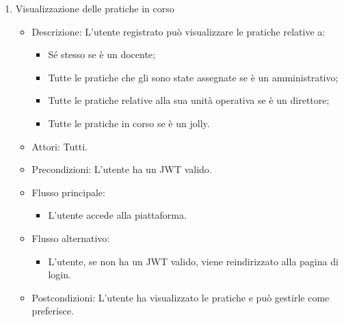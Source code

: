 \documentclass{article}
\begin{document}
\begin{enumerate}
    \item Visualizzazione delle pratiche in corso
    \begin{itemize}
        \item Descrizione: L'utente registrato può visualizzare le pratiche relative a: \begin{itemize}
            \item Sé stesso se è un docente;
            \item Tutte le pratiche che gli sono state assegnate se è un amministrativo;
            \item Tutte le pratiche relative alla sua unità operativa se è un direttore;
            \item Tutte le pratiche in corso se è un jolly.
        \end{itemize}
        \item Attori: Tutti.
        \item Precondizioni: L'utente ha un JWT valido.
        \item Flusso principale: \begin{itemize}
            \item L'utente accede alla piattaforma.
        \end{itemize}
        \item Flusso alternativo: \begin{itemize}
            \item L'utente, se non ha un JWT valido, viene reindirizzato alla pagina di login.
        \end{itemize}
        \item Postcondizioni: L'utente ha visualizzato le pratiche e può gestirle come preferisce. 
    \end{itemize}


\end{enumerate}
\end{document}
